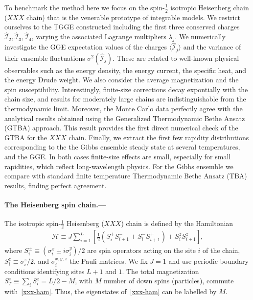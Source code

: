 \documentclass[twocolumn,superscriptaddress,prb,10pt]{revtex4-1}
\begin{document}
To benchmark the method here we focus on the spin-$\frac{1}{2}$ isotropic 
Heisenberg chain ($XXX$ chain) that is the venerable prototype of integrable 
models. We restrict ourselves to the TGGE constructed including the first 
three conserved charges $\hat{\mathcal I}_2,\hat{\mathcal I}_3,\hat{\mathcal I}_4$, 
varying the associated Lagrange multipliers $\lambda_j$. 
We numerically investigate the GGE expectation values of the charges $\langle\hat
{\mathcal I}_j\rangle$ and the variance of their ensemble fluctuations 
$\sigma^2(\hat{\mathcal I}_j)$. These are related to well-known physical observables 
such as the energy density, the energy current, the specific heat, and the energy 
Drude weight. We also consider the average magnetization and the spin susceptibility. 
Interestingly, finite-size corrections decay expontially with the chain size, and 
results for moderately large chains are indistinguishable from the thermodynamic 
limit. Moreover, the Monte Carlo data perfectly agree with the analytical 
results obtained using the Generalized Thermodynamic Bethe Ansatz (GTBA) approach. 
This result provides the first direct numerical check of the GTBA for the $XXX$ 
chain. Finally, we extract the first few rapidity distributions corresponding to the 
the Gibbs ensemble steady state at several temperatures, and the GGE. In both 
cases finite-size effects are small, especially for small rapidities, which reflect 
long-wavelength physics. For the Gibbs ensemble we compare with standard finite 
temperature Thermodynamic Bethe Ansatz (TBA) results, finding perfect agreement. 






\paragraph*{The Heisenberg spin chain.---}

The isotropic spin-$\frac{1}{2}$ Heisenberg ($XXX$) chain is defined by the 
Hamiltonian 
%
\begin{align}
\label{xxx-ham}
{\mathcal H}\equiv J\sum\limits_{i=1}^L\left[\frac{1}{2}(S_i^+S^-_{i+1} 
+S_i^{-}S_{i+1}^+)+S_i^zS_{i+1}^z\right],  
\end{align}
%
where $S^{\pm}_i\equiv (\sigma_i^x\pm i\sigma_i^y)/2$ are spin operators 
acting on the site $i$ of the chain, $S_i^z\equiv\sigma_i^z/2$, and 
$\sigma^{x,y,z}_i$ the Pauli matrices. We fix $J=1$ and use periodic 
boundary conditions identifying sites $L+1$ and $1$. The total magnetization 
$S_{T}^z\equiv\sum_iS_i^z=L/2-M$, with $M$ number of down spins (particles), 
commute with~\eqref{xxx-ham}. Thus, the eigenstates of~\eqref{xxx-ham} can 
be labelled by $M$. 
\end{document}
